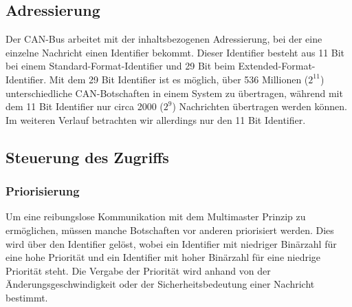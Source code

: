     \subsection{Adressierung}
    Der CAN-Bus arbeitet mit der inhaltsbezogenen Adressierung, bei der eine einzelne Nachricht einen Identifier bekommt.
    Dieser Identifier besteht aus 11 Bit bei einem Standard-Format-Identifier und 29 Bit beim Extended-Format-Identifier.
    Mit dem 29 Bit Identifier ist es möglich, über 536 Millionen ($2^{11}$) unterschiedliche CAN-Botschaften in einem System zu übertragen, während mit dem 11 Bit Identifier nur circa 2000 ($2^{9}$) Nachrichten übertragen werden können.
    Im weiteren Verlauf betrachten wir allerdings nur den 11 Bit Identifier.

    \subsection{Steuerung des Zugriffs}
        \subsubsection{Priorisierung}
        Um eine reibungslose Kommunikation mit dem Multimaster Prinzip zu ermöglichen, müssen manche Botschaften vor anderen priorisiert werden.
        Dies wird über den Identifier gelöst, wobei ein Identifier mit niedriger Binärzahl für eine hohe Priorität und ein Identifier mit hoher Binärzahl für eine niedrige Priorität steht.
        Die Vergabe der Priorität wird anhand von der Änderungsgeschwindigkeit oder der Sicherheitsbedeutung einer Nachricht bestimmt.

